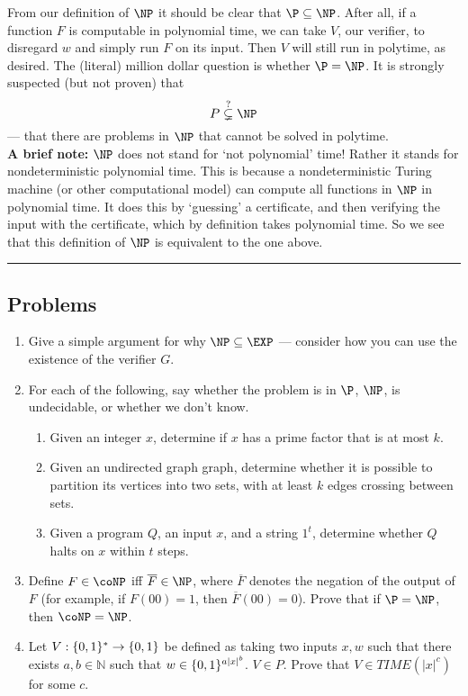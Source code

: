 \documentclass[10pt]{article}
\newcommand{\Line}{\vspace{.3cm}\hrule\vspace{.3cm}}
\begin{document}
From our definition of $\NP$ it should be clear that $\P\subseteq \NP$. After all, if a function $F$ is computable in polynomial time, we can take $V$, our verifier, to disregard $w$ and simply run $F$ on its input. Then $V$ will still run in polytime, as desired. The (literal) million dollar question is whether $\P=\NP$. It is strongly suspected (but not proven) that \[P\overset{?}\subsetneq \NP\] --- that there are problems in $\NP$ that cannot be solved in polytime.\\

{\textbf{A brief note:} $\NP$ does not stand for `not polynomial' time! Rather it stands for nondeterministic polynomial time. This is because a nondeterministic Turing machine (or other computational model) can compute all functions in $\NP$ in polynomial time. It does this by `guessing' a certificate, and then verifying the input with the certificate, which by definition takes polynomial time. So we see that this definition of $\NP$ is equivalent to the one above.}\\

\Line
\subsection{Problems}
\begin{enumerate}
\item Give a simple argument for why $\NP\subseteq\EXP$ --- consider how you can use the existence of the verifier $G$.

\item For each of the following, say whether the problem is in $\P$, $\NP$, is undecidable, or whether we don't know.

\begin{enumerate}
\item Given an integer $x$, determine if $x$ has a prime factor that is at most $k$.

\item Given an undirected graph graph, determine whether it is possible to partition its vertices into two sets, with at least $k$ edges crossing between sets.

\item Given a program $Q$, an input $x$, and a string $1^t$, determine whether $Q$ halts on $x$ within $t$ steps.

\end{enumerate}


\item Define $F \in \coNP$ iff $\overline{F} \in \NP$, where $\overline{F}$ denotes the negation of the output of $F$ (for example, if $F(00)=1$, then $\overline{F}(00)=0$). Prove that if $\P=\NP$, then $\coNP=\NP$.

\item Let $V:\{0,1\}^* \to \{0,1\}$ be defined as taking two inputs $x,w$ such that there exists $a,b\in \mathbb{N}$ such that $w\in \{0,1\}^{a|x|^b}$. $V\in P$. Prove that $V\in TIME(|x|^c)$ for some $c$.

\end{enumerate}
\end{document}
